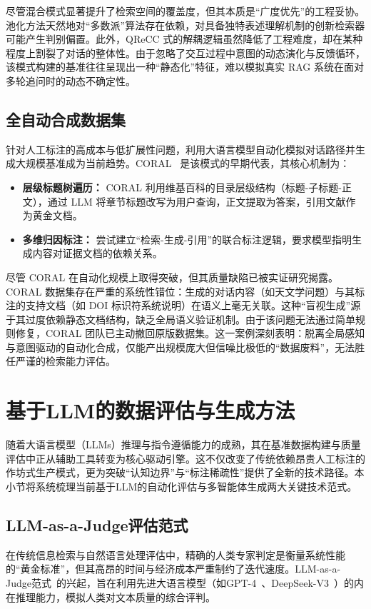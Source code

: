 尽管混合模式显著提升了检索空间的覆盖度，但其本质是“广度优先”的工程妥协。池化方法天然地对“多数派”算法存在依赖，对具备独特表述理解机制的创新检索器可能产生判别偏置。此外，QReCC 式的解耦逻辑虽然降低了工程难度，却在某种程度上割裂了对话的整体性。由于忽略了交互过程中意图的动态演化与反馈循环，该模式构建的基准往往呈现出一种“静态化”特征，难以模拟真实 RAG 系统在面对多轮追问时的动态不确定性。


\subsection{全自动合成数据集}

针对人工标注的高成本与低扩展性问题，利用大语言模型自动化模拟对话路径并生成大规模基准成为当前趋势。CORAL~\citep{Cheng2024CORALBM} 是该模式的早期代表，其核心机制为：
\begin{itemize}
    \item \textbf{层级标题树遍历：} CORAL 利用维基百科的目录层级结构（标题-子标题-正文），通过 LLM 将章节标题改写为用户查询，正文提取为答案，引用文献作为黄金文档。
    \item \textbf{多维归因标注：} 尝试建立“检索-生成-引用”的联合标注逻辑，要求模型指明生成内容对证据文档的依赖关系。
\end{itemize}

尽管 CORAL 在自动化规模上取得突破，但其质量缺陷已被实证研究揭露。CORAL 数据集存在严重的系统性错位：生成的对话内容（如天文学问题）与其标注的支持文档（如 DOI 标识符系统说明）在语义上毫无关联。这种“盲视生成”源于其过度依赖静态文档结构，缺乏全局语义验证机制。由于该问题无法通过简单规则修复，CORAL 团队已主动撤回原版数据集。这一案例深刻表明：脱离全局感知与意图驱动的自动化合成，仅能产出规模庞大但信噪比极低的“数据废料”，无法胜任严谨的检索能力评估。



\section{基于LLM的数据评估与生成方法}
随着大语言模型（LLMs）推理与指令遵循能力的成熟，其在基准数据构建与质量评估中正从辅助工具转变为核心驱动引擎。这不仅改变了传统依赖昂贵人工标注的作坊式生产模式，更为突破“认知边界”与“标注稀疏性”提供了全新的技术路径。本小节将系统梳理当前基于LLM的自动化评估与多智能体生成两大关键技术范式。
\subsection{LLM-as-a-Judge评估范式}
在传统信息检索与自然语言处理评估中，精确的人类专家判定是衡量系统性能的“黄金标准”，但其高昂的时间与经济成本严重制约了迭代速度。LLM-as-a-Judge范式~\citep{zheng2023judging,liu2023gpteval}的兴起，旨在利用先进大语言模型（如GPT-4~\citep{openai2023gpt4}、DeepSeek-V3~\citep{deepseekai2024deepseekv3}）的内在推理能力，模拟人类对文本质量的综合评判。

